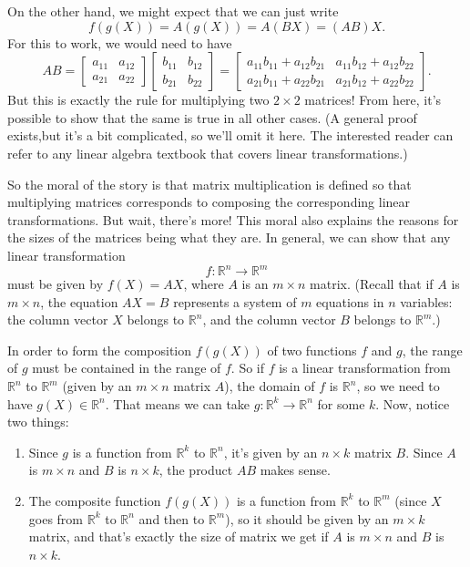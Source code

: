 \documentclass[letterpaper,12pt]{article}
\newcommand{\R}{\mathbb{R}}
\begin{document}
On the other hand, we might expect that we can just write
\[
 f(g(X)) = A(g(X)) = A(BX)=(AB)X.
\]
For this to work, we would need to have
\[
 AB = \begin{bmatrix}a_{11}&a_{12}\\a_{21}&a_{22}\end{bmatrix}\begin{bmatrix}b_{11}&b_{12}\\b_{21}&b_{22}\end{bmatrix} = \begin{bmatrix}a_{11}b_{11}+a_{12}b_{21} & a_{11}b_{12}+a_{12}b_{22}\\a_{21}b_{11}+a_{22}b_{21}& a_{21}b_{12}+a_{22}b_{22}\end{bmatrix}.
\]
But this is exactly the rule for multiplying two $2\times 2$ matrices! From here, it's possible to show that the same is true in all other cases. (A general proof exists,but it's a bit complicated, so we'll omit it here. The interested reader can refer to any linear algebra textbook that covers linear transformations.)

So the moral of the story is that matrix multiplication is defined so that multiplying matrices corresponds to composing the corresponding linear transformations. But wait, there's more! This moral also explains the reasons for the sizes of the matrices being what they are. In general, we can show that any linear transformation
\[
 f:\R^n\to \R^m
\]
must be given by $f(X)=AX$, where $A$ is an $m\times n$ matrix. (Recall that if $A$ is $m\times n$, the equation $AX=B$ represents a system of $m$ equations in $n$ variables: the column vector $X$ belongs to $\R^n$, and the column vector $B$ belongs to $\R^m$.)

In order to form the composition $f(g(X))$ of two functions $f$ and $g$, the range of $g$ must be contained in the range of $f$. So if $f$ is a linear transformation from $\R^n$ to $\R^m$ (given by an $m\times n$ matrix $A$), the domain of $f$ is $\R^n$, so we need to have $g(X)\in\R^n$. That means we can take $g:\R^k\to \R^n$ for some $k$. Now, notice two things:
\begin{enumerate}
 \item Since $g$ is a function from $\R^k$ to $\R^n$, it's given by an $n\times k$ matrix $B$. Since $A$ is $m\times n$ and $B$ is $n\times k$, the product $AB$ makes sense.
 \item The composite function $f(g(X))$ is a function from $\R^k$ to $\R^m$ (since $X$ goes from $\R^k$ to $\R^n$ and then to $\R^m$), so it should be given by an $m\times k$ matrix, and that's exactly the size of matrix we get if $A$ is $m\times n$ and $B$ is $n\times k$.
\end{enumerate}
\end{document}
